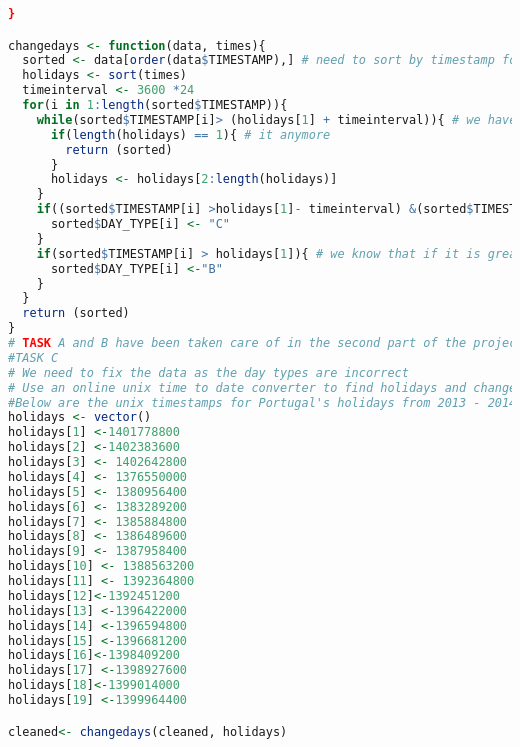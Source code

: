 \documentclass{article}
\begin{document}
\begin{lstlisting}[language=R]
}

changedays <- function(data, times){
  sorted <- data[order(data$TIMESTAMP),] # need to sort by timestamp for the below logic to work
  holidays <- sort(times)
  timeinterval <- 3600 *24
  for(i in 1:length(sorted$TIMESTAMP)){
    while(sorted$TIMESTAMP[i]> (holidays[1] + timeinterval)){ # we have already sorted the times, so if we are greater than the current holiday, we dont' need to worry about
      if(length(holidays) == 1){ # it anymore
        return (sorted)
      }
      holidays <- holidays[2:length(holidays)]  
    }
    if((sorted$TIMESTAMP[i] >holidays[1]- timeinterval) &(sorted$TIMESTAMP[i] <holidays[1])){ # if it is 24 hours before holiday
      sorted$DAY_TYPE[i] <- "C"
    }
    if(sorted$TIMESTAMP[i] > holidays[1]){ # we know that if it is greater than the holiday, it is not by more than 24 hours
      sorted$DAY_TYPE[i] <-"B"
    }
  }
  return (sorted)
}
# TASK A and B have been taken care of in the second part of the project.
#TASK C
# We need to fix the data as the day types are incorrect
# Use an online unix time to date converter to find holidays and change the days  
#Below are the unix timestamps for Portugal's holidays from 2013 - 2014
holidays <- vector()
holidays[1] <-1401778800
holidays[2] <-1402383600
holidays[3] <- 1402642800
holidays[4] <- 1376550000
holidays[5] <- 1380956400
holidays[6] <- 1383289200
holidays[7] <- 1385884800
holidays[8] <- 1386489600
holidays[9] <- 1387958400
holidays[10] <- 1388563200
holidays[11] <- 1392364800
holidays[12]<-1392451200
holidays[13] <-1396422000
holidays[14] <-1396594800
holidays[15] <-1396681200
holidays[16]<-1398409200
holidays[17] <-1398927600
holidays[18]<-1399014000
holidays[19] <-1399964400

cleaned<- changedays(cleaned, holidays)


\end{lstlisting}
\end{document}
